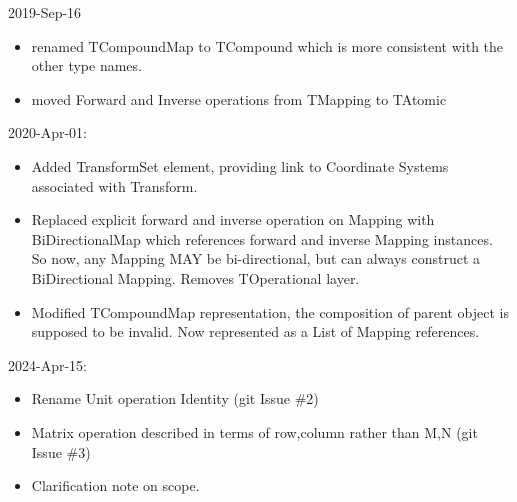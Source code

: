 \documentclass[11pt,a4paper]{ivoa}
\begin{document}
2019-Sep-16
\begin{itemize}
\item renamed TCompoundMap to TCompound which is more consistent with the other type names.
\item moved Forward and Inverse operations from TMapping to TAtomic
\end{itemize}
2020-Apr-01:
\begin{itemize}
\item Added TransformSet element, providing link to Coordinate Systems associated with Transform.
\item Replaced explicit forward and inverse operation on Mapping with BiDirectionalMap which references forward and inverse Mapping instances.  So now, any Mapping MAY be bi-directional, but can always construct a BiDirectional Mapping.  Removes TOperational layer.
\item Modified TCompoundMap representation, the composition of parent object is supposed to be invalid.  Now represented as a List of Mapping references.
\end{itemize}
2024-Apr-15:
\begin{itemize}
\item Rename Unit operation Identity (git Issue \#2)
\item Matrix operation described in terms of row,column rather than M,N (git Issue \#3)
\item Clarification note on scope.
\end{itemize}






\pagebreak

\end{document}
